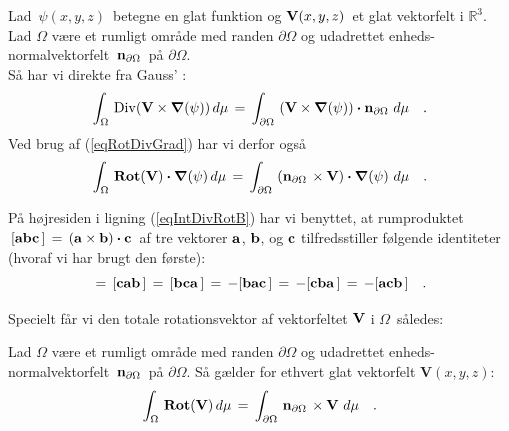 \begin{theorem} \label{thmGaussStokes}
Lad $\,\psi(x,y,z)\,$ betegne en glat funktion og
${\bf{V}}(x,y,z)\,$ et glat vektorfelt i
$\mathbb{R}^{3}$. Lad $\Omega$ være et rumligt
område med randen $\partial \Omega$ og udadrettet
enheds-normalvektorfelt $\,{\bf{n}}_{\partial
\Omega}\,$ på $\partial \Omega$. \\

Så har vi direkte fra Gauss' :
\begin{equation} \label{eqIntDivRotA}
\int_{\Omega}\, \operatorname{Div}({\bf{V}}\times
\bm{\nabla}(\psi))\, d\mu \,  = \, \int_{\partial
\Omega}\,  \left({\bf{V}}\times
\bm{\nabla}(\psi)\right)\bm{\cdot} {\bf{n}}_{\partial
\Omega} \,\, d\mu \quad .
\end{equation}
Ved brug af  (\ref{eqRotDivGrad}) har vi derfor
også
\begin{equation} \label{eqIntDivRotB}
\int_{\Omega}\, \operatorname{\mathbf{Rot}}({\bf{V}})\bm{\cdot}\bm{\nabla}(\psi)\,
d\mu \,  = \, \int_{\partial \Omega}\,
\left({\bf{n}}_{\partial \Omega}\, \times
{\bf{V}}\right) \bm{\cdot} \bm{\nabla}(\psi)
 \, \,d\mu \quad .
\end{equation}
\end{theorem}

\begin{think}
På højresiden i ligning (\ref{eqIntDivRotB}) har vi
benyttet, at rumproduktet $\,[{\bf{a}} {\bf{b}}
{\bf{c}}\,]\, = \, ({\bf{a}} \times {\bf{b}})
\bm{\cdot} {\bf{c}}\, $  af tre vektorer ${\bf{a}}$,
${\bf{b}}$, og ${\bf{c}}$ tilfredsstiller
følgende identiteter (hvoraf vi har brugt den
første):
\begin{equation}
[{\bf{a}} {\bf{b}} {\bf{c}}\,]\, = \, [{\bf{c}}
{\bf{a}} {\bf{b}}\,] \, = \, [{\bf{b}} {\bf{c}}
{\bf{a}}\,] \, = \, - [{\bf{b}} {\bf{a}}
{\bf{c}}\,]\, = \, -[{\bf{c}} {\bf{b}}
{\bf{a}}\,] \, = \, -[{\bf{a}} {\bf{c}}
{\bf{b}}\,] \quad .
\end{equation}
\end{think}


Specielt får vi den totale rotationsvektor af
vektorfeltet ${\bf{V}}$ i $\Omega\,$ således:

\begin{corollary}\label{lemmaTotalRot}
Lad $\Omega$ være et rumligt
område med randen $\partial \Omega$ og udadrettet
enheds-normalvektorfelt $\,{\bf{n}}_{\partial
\Omega}\,$ på $\partial \Omega$. Så gælder for ethvert glat vektorfelt $\mathbf{V}(x,y,z)$:
\begin{equation} \label{eqVridning}
\int_{\Omega}\, \operatorname{\mathbf{Rot}}({\bf{V}})\, d\mu \,  = \,
\int_{\partial \Omega}\, {\bf{n}}_{\partial
\Omega}\, \times {\bf{V}}
 \, \,d\mu \quad .
\end{equation}
\end{corollary}

